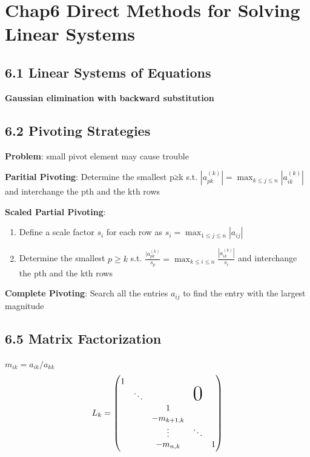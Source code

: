 \documentclass[11pt]{article}
\begin{document}
\section{Chap6 Direct Methods for Solving Linear Systems}
\label{sec:org0670033}
\subsection{6.1 Linear Systems of Equations}
\label{sec:orga2f4640}
\textbf{Gaussian elimination with backward substitution}
\subsection{6.2 Pivoting Strategies}
\label{sec:orgd3b2c18}
\textbf{Problem}: small pivot element may cause trouble

\textbf{Paritial Pivoting}: Determine the smallest p≥k s.t.
\(|a_{pk}^{(k)}|=\displaystyle\max_{k\le j\le n}|a_{ik}^{(k)}|\) and
interchange the pth and the kth rows

\textbf{Scaled Partial Pivoting}:
\begin{enumerate}
\item Define a scale factor \(s_i\) for each row as \(s_i=\displaystyle\max_{1\le
      j\le n}|a_{ij}|\)
\item Determine the smallest \(p\ge k\) s.t.
\(\frac{|a_{pk}^{(k)}}{s_p}=\displaystyle\max_{k\le i\le
      n}\frac{|a_{ik}^{(k)}|}{s_i}\)
and interchange the pth and the kth rows
\end{enumerate}


\textbf{Complete Pivoting}: Search all the entries \(a_{ij}\) to find the entry with
the largest magnitude
\subsection{6.5 Matrix Factorization}
\label{sec:org302f689}
\(m_{ik}=a_{ik}/a_{kk}\)
\begin{equation*}
L_k=
\begin{pmatrix}
1 &            &            &               &  \\
  & \ddots     &            &\mbox{\Huge 0} &  \\
  &            & 1          &               &  \\
  &            & -m_{k+1,k} &               &  \\
  &            & \vdots     & \ddots        &  \\
  &            & -m_{n,k}   &               & 1\\
\end{pmatrix}
\end{equation*}  
\end{document}
